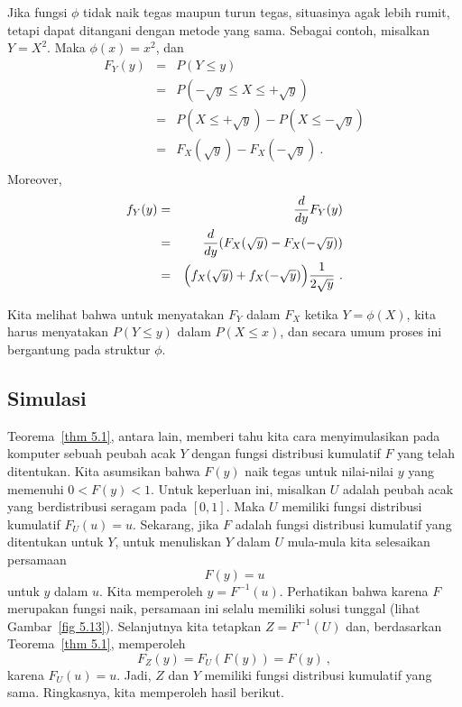 \par Jika fungsi $\phi$ tidak naik tegas maupun turun tegas, situasinya agak lebih
rumit, tetapi dapat ditangani dengan metode yang sama. Sebagai contoh, misalkan
$Y = X^2$. Maka $\phi(x) = x^2$, dan
\begin{eqnarray*} F_Y(y) & = & P(Y \leq y) \\
       & = & P(-\sqrt y \leq X \leq +\sqrt y) \\
       & = & P(X \leq +\sqrt y) - P(X \leq -\sqrt y) \\
       & = & F_X(\sqrt y) - F_X(-\sqrt y)\ .\\
\end{eqnarray*} Moreover,
\begin{eqnarray*} f_Y(y) & = & \frac d{dy} F_Y(y) \\
       & = & \frac d{dy} (F_X(\sqrt y) - F_X(-\sqrt y)) \\
       & = & \Bigl(f_X(\sqrt y) + f_X(-\sqrt y)\Bigr) \frac 1{2\sqrt y}\ . \\
\end{eqnarray*}
\par 
Kita melihat bahwa untuk menyatakan $F_Y$ dalam $F_X$ ketika $Y = \phi(X)$, kita
harus menyatakan $P(Y \leq y)$ dalam $P(X \leq x)$, dan secara umum proses ini
bergantung pada struktur $\phi$.
\subsection*{Simulasi}
Teorema~\ref{thm 5.1}, antara lain, memberi tahu kita cara menyimulasikan pada
komputer sebuah peubah acak $Y$ dengan fungsi distribusi kumulatif $F$ yang telah
ditentukan.  Kita asumsikan bahwa $F(y)$ naik tegas untuk nilai-nilai $y$ yang
memenuhi $0 < F(y) < 1$.  Untuk keperluan ini, misalkan $U$ adalah peubah acak yang
berdistribusi seragam pada $[0, 1]$. Maka $U$ memiliki fungsi distribusi kumulatif
$F_U(u) = u$.  Sekarang, jika $F$ adalah fungsi distribusi kumulatif yang ditentukan
untuk $Y$, untuk menuliskan $Y$ dalam $U$ mula-mula kita selesaikan persamaan
$$ 
F(y) = u
$$ 
untuk $y$ dalam $u$.  Kita memperoleh $y = F^{-1}(u)$.  Perhatikan bahwa karena $F$
merupakan fungsi naik, persamaan ini selalu memiliki solusi tunggal (lihat
Gambar~\ref{fig
5.13}).  Selanjutnya kita tetapkan $Z = F^{-1}(U)$ dan, berdasarkan
Teorema~\ref{thm 5.1}, memperoleh
$$ 
F_Z(y) = F_U(F(y)) = F(y)\ ,
$$ 
karena $F_U(u) = u$.  Jadi, $Z$ dan $Y$ memiliki fungsi distribusi kumulatif yang
sama.  Ringkasnya, kita memperoleh hasil berikut.

